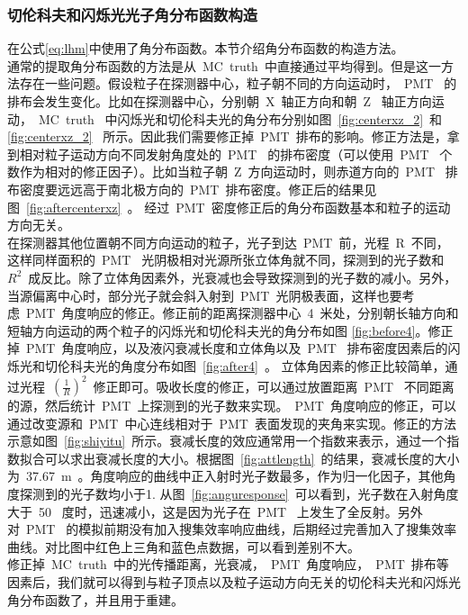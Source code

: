 \subsubsection{切伦科夫和闪烁光光子角分布函数构造}
在公式\ref{eq:lhm}中使用了角分布函数。本节介绍角分布函数的构造方法。\\
通常的提取角分布函数的方法是从~MC~truth~中直接通过平均得到。但是这一方法存在一些问题。假设粒子在探测器中心，粒子朝不同的方向运动时，~PMT~ 的排布会发生变化。比如在探测器中心，分别朝~X~轴正方向和朝~Z~ 轴正方向运动，~MC~truth~ 中闪烁光和切伦科夫光的角分布分别如图~\ref{fig:centerxz_2}~和~
\ref{fig:centerxz_2}~ 所示。因此我们需要修正掉~PMT~排布的影响。修正方法是，拿到相对粒子运动方向不同发射角度处的~PMT~ 的排布密度（可以使用~PMT~ 个数作为相对的修正因子）。比如当粒子朝~Z~方向运动时，则赤道方向的~PMT~ 排布密度要远远高于南北极方向的~PMT~排布密度。修正后的结果见图~\ref{fig:aftercenterxz}~。 经过~PMT~密度修正后的角分布函数基本和粒子的运动方向无关。\\
在探测器其他位置朝不同方向运动的粒子，光子到达~PMT~前，光程~R~不同，这样同样面积的~PMT~ 光阴极相对光源所张立体角就不同，探测到的光子数和~$R^2$~成反比。除了立体角因素外，光衰减也会导致探测到的光子数的减小。另外，当源偏离中心时，部分光子就会斜入射到~PMT~光阴极表面，这样也要考虑~PMT~角度响应的修正。修正前的距离探测器中心~4~米处，分别朝长轴方向和短轴方向运动的两个粒子的闪烁光和切伦科夫光的角分布如图
\ref{fig:before4}。修正掉~PMT~角度响应，以及液闪衰减长度和立体角以及~PMT~ 排布密度因素后的闪烁光和切伦科夫光的角度分布如图~\ref{fig:after4}~。 立体角因素的修正比较简单，通过光程~$\left ( \frac{1}{R} \right )^2 $~修正即可。吸收长度的修正，可以通过放置距离~PMT~ 不同距离的源，然后统计~PMT~上探测到的光子数来实现。~PMT~角度响应的修正，可以通过改变源和~PMT~中心连线相对于~PMT~表面发现的夹角来实现。修正的方法示意如图~\ref{fig:shiyitu}~所示。衰减长度的效应通常用一个指数来表示，通过一个指数拟合可以求出衰减长度的大小。根据图~\ref{fig:attlength}~的结果，衰减长度的大小为~37.67~m~。角度响应的曲线中正入射时光子数最多，作为归一化因子，其他角度探测到的光子数均小于1. 从图~\ref{fig:anguresponse}~可以看到，光子数在入射角度大于~50~ 度时，迅速减小，这是因为光子在~PMT~ 上发生了全反射。另外对~PMT~ 的模拟前期没有加入搜集效率响应曲线，后期经过完善加入了搜集效率曲线。对比图中红色上三角和蓝色点数据，可以看到差别不大。\\
修正掉~MC~truth~中的光传播距离，光衰减，~PMT~角度响应，~PMT~排布等因素后，我们就可以得到与粒子顶点以及粒子运动方向无关的切伦科夫光和闪烁光角分布函数了，并且用于重建。

